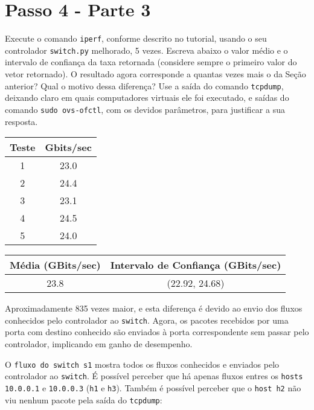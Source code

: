 \documentclass[12pt,letterpaper]{article}
\begin{document}
\section{Passo 4 - Parte 3}

Execute o comando \texttt{iperf}, conforme descrito no
tutorial, usando o seu controlador \texttt{switch.py} melhorado, 5
vezes. Escreva abaixo o valor médio e o intervalo de confiança da taxa
retornada (considere sempre o primeiro valor do vetor retornado). O
resultado agora corresponde a quantas vezes mais o da Seção anterior?
Qual o motivo dessa diferença? Use a saída do comando
\texttt{tcpdump}, deixando claro em quais computadores virtuais ele
foi executado, e saídas do comando \texttt{sudo ovs-ofctl}, com os
devidos parâmetros, para justificar a sua resposta.

\begin{center}
\begin{tabular}{ |c|c| } 
 \hline
 Teste & Gbits/sec \\
 \hline
 1 & 23.0 \\ 
 2 & 24.4 \\ 
 3 & 23.1 \\ 
 4 & 24.5 \\ 
 5 & 24.0 \\ 
 \hline
\end{tabular}
\end{center}

\begin{center}
\begin{tabular}{|c|c|}
 \hline
 Média (GBits/sec) & Intervalo de Confiança (GBits/sec)\\
 \hline
 23.8 & (22.92, 24.68) \\
 \hline
 \end{tabular}
\end{center}

Aproximadamente 835 vezes maior, e esta diferença é devido ao envio dos fluxos conhecidos pelo controlador ao \texttt{switch}. Agora, os pacotes recebidos por uma porta com destino conhecido são enviados à porta correspondente sem passar pelo controlador, implicando em ganho de desempenho.

O \texttt{fluxo do switch s1} mostra todos os fluxos conhecidos e enviados pelo controlador ao \texttt{switch}. É possível perceber que há apenas fluxos entres os \texttt{hosts 10.0.0.1} e \texttt{10.0.0.3} (\texttt{h1} e \texttt{h3}). Também é possível perceber que o \texttt{host h2} não viu nenhum pacote pela saída do \texttt{tcpdump}:
\end{document}
